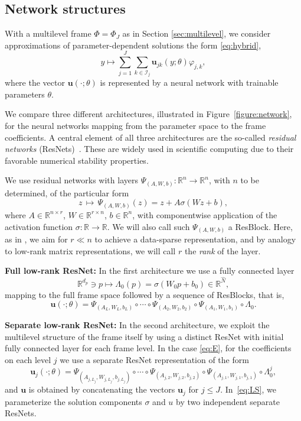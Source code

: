 \documentclass[a4paper,11pt]{amsart}
\numberwithin{equation}{section}
\theoremstyle{definition}
\theoremstyle{remark}
\theoremstyle{plain}
\newcommand{\R}{\mathbb{R}}
\begin{document}
%
\subsection{Network structures}\label{section:stable:structure}

%
With a multilevel frame $\Phi = \Phi_J$ as in Section \ref{sec:multilevel}, we consider approximations of parameter-dependent solutions the form \eqref{eq:hybrid}, 
\[
y \mapsto  \sum_{j=1}^J\sum_{k \in \mathcal{I}_j} \mathbf{u}_{jk}(y ; \theta) \varphi_{j,k},
\]
where the vector $\mathbf{u}(\cdot; \theta)$ is represented by a neural network with trainable parameters $\theta$.

We compare three different architectures,
illustrated in Figure~\ref{figure:network},
 for the neural networks mapping from the parameter space to the frame coefficients. A central element of all three architectures are the so-called \emph{residual networks} (ResNets)~\cite{He2016Deep}. These are widely used in scientific computing due to their favorable numerical stability properties. 

We use residual networks with layers $\Psi_{(A,W,b)} \colon \R^n\to\R^n$, with $n$ to be determined, of the particular form 
\begin{equation}\label{eq:resnetlayer}
	z \,\mapsto\, \Psi_{(A,W,b)}(z) = z+A\sigma( W z + b),
\end{equation}
where $A\in \mathbb R^{n \times r}$, $W\in \mathbb R^{r\times n}$, $b \in\mathbb R^n$, with componentwise application of the activation function $\sigma\colon \R\to\R$. 
We will also call such $\Psi_{(A,W,b)}$ a ResBlock.
Here, as in \cite{BachmayrDahmenOster2024}, we aim for $r \ll n$ to achieve a data-sparse representation, and by analogy to low-rank matrix representations, we will call $r$ the \emph{rank} of the layer.

\textbf{Full low-rank ResNet: } 
In the first architecture we use a fully connected layer \[  \R^{d_p}  \ni p \mapsto \Lambda_0(p) = \sigma(W_0 p + b_0) \in \R^{\hat N}, \] mapping to the full frame space followed by a sequence of ResBlocks, that is,
\[  \mathbf{u}( \cdot; \theta)=\Psi_{(A_{L}, W_{L}, b_{L})} \circ \cdots
\circ  \Psi_{(A_{2}, W_{2}, b_{2})} 
\circ \Psi_{(A_{1}, W_{1}, b_{1})} \circ \Lambda_0. \]

\textbf{Separate low-rank ResNet: } In the second architecture, we exploit the multilevel structure of the frame itself by using a distinct ResNet with initial fully connected layer for each frame level.
In the case \eqref{eq:E}, for the coefficients on each level $j$ we use a separate ResNet representation of the form
\[  \mathbf{u}_{j}( \cdot; \theta) = \Psi_{(A_{j,L_j}, W_{j,L_j}, b_{j,L_j})} \circ \cdots
\circ  \Psi_{(A_{j,2}, W_{j,2}, b_{j,2})} 
\circ \Psi_{(A_{j,1}, W_{j,1}, b_{j,1})} \circ \Lambda^j_0, \]
and $\mathbf u$ is obtained by concatenating the vectors $\mathbf u_j$ for $j \leq J$.
In~\eqref{eq:LS}, we parameterize the solution components $\sigma$ and $u$ by two independent separate ResNets.
\end{document}
